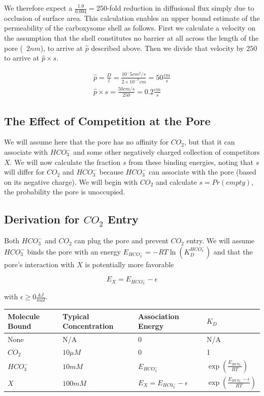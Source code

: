 \documentclass[10pt,a4paper]{article}
\begin{document}
We therefore expect a $\frac{1.0}{0.004} = 250$-fold reduction in diffusional flux simply due to occlusion of surface area. This calculation enables an upper bound estimate of the permeability of the carboxysome shell as follows. First we calculate a velocity on the assumption that the shell constitutes no barrier at all across the length of the pore (~$2nm$), to arrive at $\hat{p}$ described above. Then we divide that velocity by $250$ to arrive at $\hat{p} \times s$. 

\begin{align}
\hat{p} = \frac{D}{l} = \frac{10^-5 cm^2/s}{2 \times  10^{-7} cm} = 50 \frac{cm}{s} \\
\hat{p} \times s = \frac{50 cm/s}{250} = 0.2 \frac{cm}{s}
\end{align}

\subsection{The Effect of Competition at the Pore}
We will assume here that the pore has no affinity for $CO_2$, but that it can associate with $HCO_3^-$ and some other negatively charged collection of competitors $X$. We will now calculate the fraction $s$ from these binding energies, noting that $s$ will differ for $CO_2$ and $HCO_3^-$ because $HCO_3^-$ can associate with the pore (based on its negative charge). We will begin with  $CO_2$ and calculate $s = Pr(empty)$, the probability the pore is unoccupied. 

\subsection{Derivation for $CO_2$ Entry}
Both $HCO_3^-$ and $CO_2$ can plug the pore and prevent $CO_2$ entry. We will assume $HCO_3^-$ binds the pore with an energy $E_{HCO_3^-} = -RT \ln(K_D^{HCO_3^-})$ and that the pore's interaction with $X$ is potentially more favorable 

\begin{equation}
E_{X} = E_{HCO_3^-} - \epsilon
\end{equation}

with $\epsilon \ge 0 \frac{kJ}{mol}$. 

\begin{center}
    \begin{tabular}{ | l | l | l | l |}
    \hline
    Molecule Bound & Typical Concentration & Association Energy  & $K_D$ \\ \hline
    None & N/A & 0 & N/A \\ \hline
    $CO_2$ & $10 \mu M$ & $0$ & 1 \\ \hline
    $HCO_3^-$ & $10 mM$ & $E_{HCO_3^-}$ & $\exp\left(\frac{E_{HC0_3^-}}{RT}\right)$ \\ \hline
    $X$ & $100 mM$ & $E_{X} = E_{HC0_3^-} - \epsilon$ & $\exp\left(\frac{E_{HC0_3^-} - \epsilon}{RT}\right)$ \\
    \hline
    \end{tabular}
\end{center}
\end{document}
